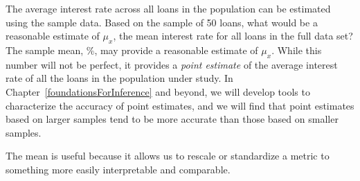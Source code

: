 \begin{example}{The average interest rate across all loans
  in the population can be estimated using the sample data.
  Based on the sample of 50 loans,
  what would be a reasonable estimate of $\mu_x$,
  the mean interest rate for all loans in the
  full data set?}
The sample mean, \loanAvg{}\%, may provide a reasonable estimate
of $\mu_x$.
While this number will not be perfect,
it provides a \emph{point estimate} 
of the average interest rate of all the loans in the
population under study.
In Chapter~\ref{foundationsForInference} and beyond,
we will develop tools to characterize the accuracy
of point estimates, and we will find that point estimates
based on larger samples tend to be more accurate than
those based on smaller samples.
\end{example}


The mean is useful because it allows us to
rescale or standardize a metric to something more easily
interpretable and comparable.

